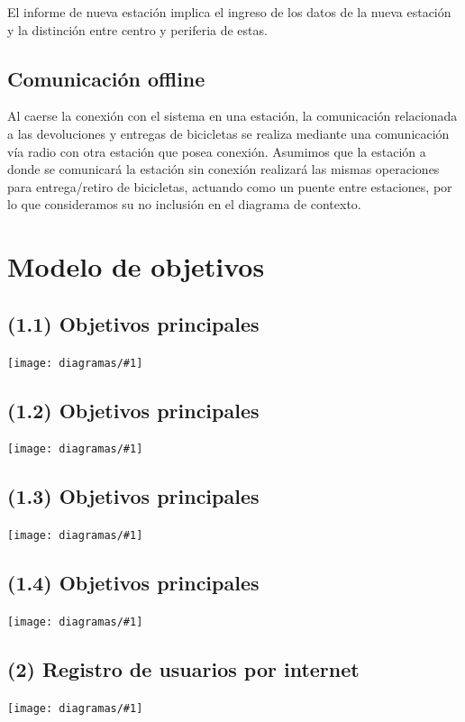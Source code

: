 \documentclass[a4paper, 10pt, twoside]{article}
\newcommand{\diagramav}[1]{
  \texttt{[image: diagramas/\#1]}
}
\newcommand{\diagramah}[1]{
  \texttt{[image: diagramas/\#1]}
}
\begin{document}
El informe de nueva estación implica el ingreso de los datos de la nueva estación y la distinción entre centro y periferia de estas.

\subsection{Comunicación offline}
Al caerse la conexión con el sistema en una estación, la comunicación relacionada a las devoluciones y entregas de bicicletas se realiza
mediante una comunicación vía radio con otra estación que posea conexión.
Asumimos que la estación a donde se comunicará la estación sin conexión realizará las mismas operaciones para entrega/retiro de bicicletas, actuando como un puente entre estaciones, por lo que consideramos su no inclusión en el diagrama de contexto.



\section{Modelo de objetivos}

\subsection{(1.1)  Objetivos principales}
\diagramav{objetivos-1.1}

\subsection{(1.2)  Objetivos principales}
\diagramah{objetivos-1.2}

\subsection{(1.3)  Objetivos principales}
\diagramav{objetivos-1.3}

\subsection{(1.4)  Objetivos principales}
\diagramah{objetivos-1.4}

\subsection{(2)    Registro de usuarios por internet}
\diagramah{objetivos-2}
\end{document}
